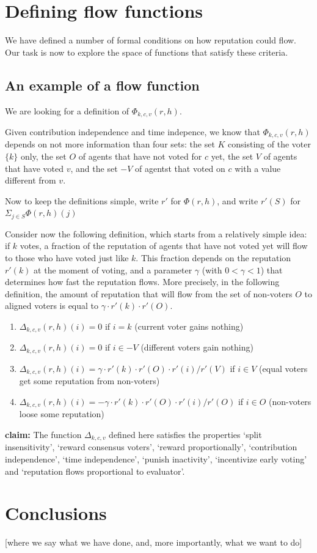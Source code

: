 \documentclass{article}
\newcommand{\flow}{\Phi}
\begin{document}
\section{Defining flow functions}

We have defined a number of formal conditions on how reputation could flow. Our task is now to explore the space of functions that satisfy these criteria.

\subsection{An example of a flow function}


We are looking for a definition of $\Phi_{k,c,v}(r, h)$.

Given contribution independence and time indepence, we know that  $\Phi_{k,c,v}(r, h)$ depends on not more information than four sets: the set $K$ consisting of the voter $\{k\}$ only, the set $O$ of agents that have not voted for $c$ yet, the set $V$ of agents that have voted $v$, and the set $-V$ of agentst that voted on $c$ with a value different from $v$.

Now to keep the definitions simple, write $r'$ for $\flow(r, h)$, and write $r'(S)$ for $\Sigma_{j\in S}\flow(r, h)(j)$

Consider now the following definition, which starts from a relatively simple idea: if $k$  votes, a fraction of the reputation of agents that have not voted yet will flow to those who have voted just like $k$. This fraction depends on the reputation $r'(k)$ at the moment of voting, and a parameter $\gamma$ (with $0<\gamma < 1$) that determines how fast the reputation flows. 
More precisely, in the following definition, the amount of reputation that will flow from the set of non-voters $O$ to aligned voters is equal to $\gamma \cdot r'(k) \cdot r'(O)$.


\begin{enumerate}
\item $\Delta_{k,c,v}(r,h)(i) = 0$ if $i=k$ (current voter gains nothing)
\item $\Delta_{k,c,v}(r,h)(i) = 0$ if $i \in -V$ (different voters gain nothing)
\item $\Delta_{k,c,v}(r,h)(i) = \gamma \cdot r'(k) \cdot  r'(O) \cdot r'(i) / r'(V)$ 
if $i \in V$ (equal voters get some reputation from non-voters)
\item $\Delta_{k,c,v}(r,h)(i) =  -\gamma \cdot r'(k) \cdot
r'(O)
\cdot r'(i) / r'(O) $ if $i \in O$ (non-voters loose some reputation)
\end{enumerate}
{\bf claim:} The function $\Delta_{k, c, v}$ defined here satisfies the properties `split insensitivity', `reward consensus voters', `reward proportionally', `contribution independence',  `time independence',  `punish inactivity', `incentivize early voting' and `reputation flows proportional to evaluator'.


\section{Conclusions}
[where we say what we have done, and, more importantly, what we want to do]
\end{document}
